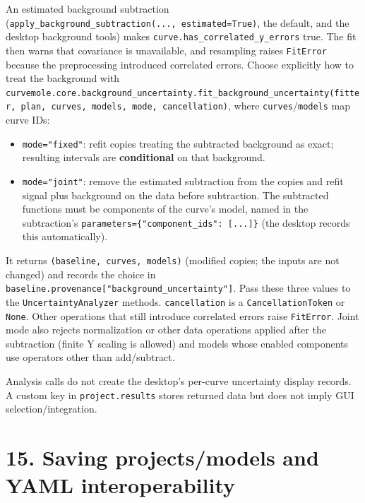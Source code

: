 \documentclass[
  10pt,
  a4paper,
  oneside]{scrreprt}
\providecommand{\tightlist}{%
  \setlength{\itemsep}{0pt}\setlength{\parskip}{0pt}}
\begin{document}
An estimated background subtraction
(\texttt{apply\_background\_subtraction(...,\ estimated=True)}, the
default, and the desktop background tools) makes
\texttt{curve.has\_correlated\_y\_errors} true. The fit then warns that
covariance is unavailable, and resampling raises \texttt{FitError}
because the preprocessing introduced correlated errors. Choose
explicitly how to treat the background with
\texttt{curvemole.core.background\_uncertainty.fit\_background\_uncertainty(fitter,\ plan,\ curves,\ models,\ mode,\ cancellation)},
where \texttt{curves}/\texttt{models} map curve IDs:

\begin{itemize}
\tightlist
\item
  \texttt{mode="fixed"}: refit copies treating the subtracted background
  as exact; resulting intervals are \textbf{conditional} on that
  background.
\item
  \texttt{mode="joint"}: remove the estimated subtraction from the
  copies and refit signal plus background on the data before
  subtraction. The subtracted functions must be components of the
  curve's model, named in the subtraction's
  \texttt{parameters=\{"component\_ids":\ {[}...{]}\}} (the desktop
  records this automatically).
\end{itemize}

It returns \texttt{(baseline,\ curves,\ models)} (modified copies; the
inputs are not changed) and records the choice in
\texttt{baseline.provenance{[}"background\_uncertainty"{]}}. Pass these
three values to the \texttt{UncertaintyAnalyzer} methods.
\texttt{cancellation} is a \texttt{CancellationToken} or \texttt{None}.
Other operations that still introduce correlated errors raise
\texttt{FitError}. Joint mode also rejects normalization or other data
operations applied after the subtraction (finite Y scaling is allowed)
and models whose enabled components use operators other than
add/subtract.

Analysis calls do not create the desktop's per-curve uncertainty display
records. A custom key in \texttt{project.results} stores returned data
but does not imply GUI selection/integration.

\hypertarget{saving-projectsmodels-and-yaml-interoperability}{%
\section{15. Saving projects/models and YAML
interoperability}\label{saving-projectsmodels-and-yaml-interoperability}}
\end{document}
